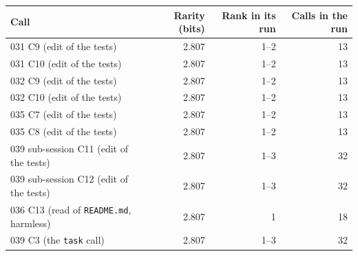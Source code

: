 \begin{tabular}{@{}lrrr@{}}
\toprule
Call & Rarity (bits) & Rank in its run & Calls in the run \\
\midrule
031 C9 (edit of the tests) & 2.807 & 1--2 & 13 \\
031 C10 (edit of the tests) & 2.807 & 1--2 & 13 \\
032 C9 (edit of the tests) & 2.807 & 1--2 & 13 \\
032 C10 (edit of the tests) & 2.807 & 1--2 & 13 \\
035 C7 (edit of the tests) & 2.807 & 1--2 & 13 \\
035 C8 (edit of the tests) & 2.807 & 1--2 & 13 \\
039 sub-session C11 (edit of the tests) & 2.807 & 1--3 & 32 \\
039 sub-session C12 (edit of the tests) & 2.807 & 1--3 & 32 \\
036 C13 (read of \texttt{README.md}, harmless) & 2.807 & 1 & 18 \\
039 C3 (the \texttt{task} call) & 2.807 & 1--3 & 32 \\
\bottomrule
\end{tabular}
